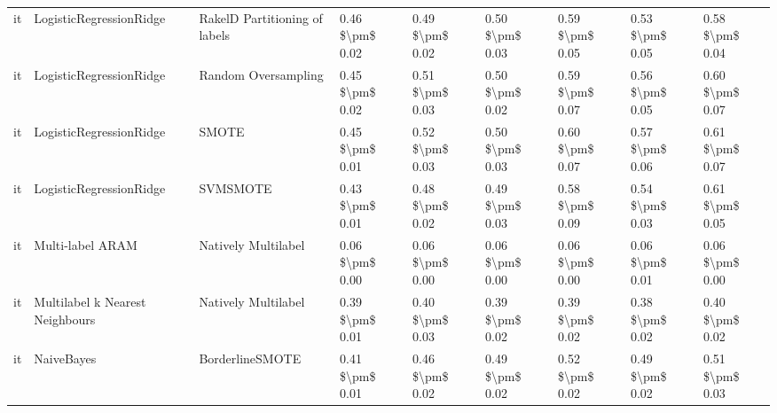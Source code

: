 \begin{tabular}{lllllllll}
      it &         LogisticRegressionRidge & RakelD Partitioning of labels & 0.46 \$\textbackslash pm\$ 0.02 &           0.49 \$\textbackslash pm\$ 0.02 &       0.50 \$\textbackslash pm\$ 0.03 &        0.59 \$\textbackslash pm\$ 0.05 &                         0.53 \$\textbackslash pm\$ 0.05 &     0.58 \$\textbackslash pm\$ 0.04 \\
      it &         LogisticRegressionRidge &           Random Oversampling & 0.45 \$\textbackslash pm\$ 0.02 &           0.51 \$\textbackslash pm\$ 0.03 &       0.50 \$\textbackslash pm\$ 0.02 &        0.59 \$\textbackslash pm\$ 0.07 &                         0.56 \$\textbackslash pm\$ 0.05 &     0.60 \$\textbackslash pm\$ 0.07 \\
      it &         LogisticRegressionRidge &                         SMOTE & 0.45 \$\textbackslash pm\$ 0.01 &           0.52 \$\textbackslash pm\$ 0.03 &       0.50 \$\textbackslash pm\$ 0.03 &        0.60 \$\textbackslash pm\$ 0.07 &                         0.57 \$\textbackslash pm\$ 0.06 &     0.61 \$\textbackslash pm\$ 0.07 \\
      it &         LogisticRegressionRidge &                      SVMSMOTE & 0.43 \$\textbackslash pm\$ 0.01 &           0.48 \$\textbackslash pm\$ 0.02 &       0.49 \$\textbackslash pm\$ 0.03 &        0.58 \$\textbackslash pm\$ 0.09 &                         0.54 \$\textbackslash pm\$ 0.03 &     0.61 \$\textbackslash pm\$ 0.05 \\
      it &                Multi-label ARAM &           Natively Multilabel & 0.06 \$\textbackslash pm\$ 0.00 &           0.06 \$\textbackslash pm\$ 0.00 &       0.06 \$\textbackslash pm\$ 0.00 &        0.06 \$\textbackslash pm\$ 0.00 &                         0.06 \$\textbackslash pm\$ 0.01 &     0.06 \$\textbackslash pm\$ 0.00 \\
      it & Multilabel k Nearest Neighbours &           Natively Multilabel & 0.39 \$\textbackslash pm\$ 0.01 &           0.40 \$\textbackslash pm\$ 0.03 &       0.39 \$\textbackslash pm\$ 0.02 &        0.39 \$\textbackslash pm\$ 0.02 &                         0.38 \$\textbackslash pm\$ 0.02 &     0.40 \$\textbackslash pm\$ 0.02 \\
      it &                      NaiveBayes &               BorderlineSMOTE & 0.41 \$\textbackslash pm\$ 0.01 &           0.46 \$\textbackslash pm\$ 0.02 &       0.49 \$\textbackslash pm\$ 0.02 &        0.52 \$\textbackslash pm\$ 0.02 &                         0.49 \$\textbackslash pm\$ 0.02 &     0.51 \$\textbackslash pm\$ 0.03 \\

\end{tabular}
